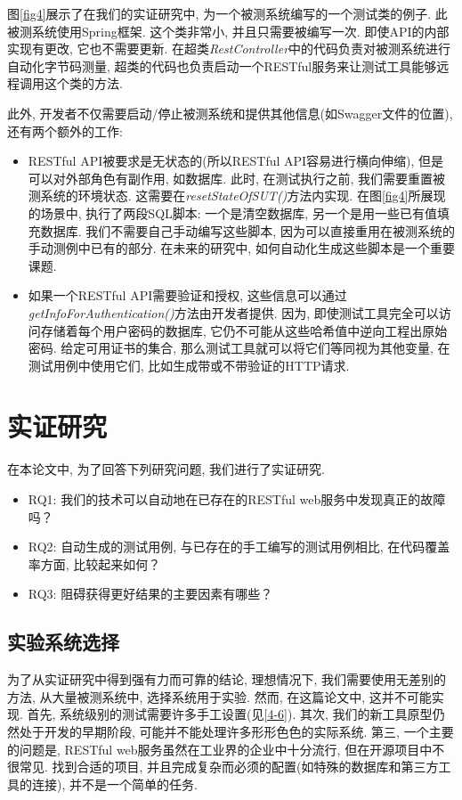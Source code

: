     图\ref{fig4}展示了在我们的实证研究中, 为一个被测系统编写的一个测试类的例子. 此被测系统使用Spring框架. 这个类非常小, 并且只需要被编写一次. 即使API的内部实现有更改, 它也不需要更新. 在超类\textit{RestController}中的代码负责对被测系统进行自动化字节码测量, 超类的代码也负责启动一个RESTful服务来让测试工具能够远程调用这个类的方法. 
    
    此外, 开发者不仅需要启动/停止被测系统和提供其他信息(如Swagger文件的位置), 还有两个额外的工作: 
    \begin{itemize}
      \item RESTful API被要求是无状态的(所以RESTful API容易进行横向伸缩), 但是可以对外部角色有副作用, 如数据库. 此时, 在测试执行之前, 我们需要重置被测系统的环境状态. 这需要在\textit{resetStateOfSUT()}方法内实现. 在图\ref{fig4}所展现的场景中, 执行了两段SQL脚本: 一个是清空数据库, 另一个是用一些已有值填充数据库. 我们不需要自己手动编写这些脚本, 因为可以直接重用在被测系统的手动测例中已有的部分. 在未来的研究中, 如何自动化生成这些脚本是一个重要课题. 
        
        \item 如果一个RESTful API需要验证和授权, 这些信息可以通过\textit{getInfoForAuthentication()}方法由开发者提供. 因为, 即使测试工具完全可以访问存储着每个用户密码的数据库, 它仍不可能从这些哈希值中逆向工程出原始密码. 给定可用证书的集合, 那么测试工具就可以将它们等同视为其他变量, 在测试用例中使用它们, 比如生成带或不带验证的HTTP请求. 
    \end{itemize}

\section{实证研究}
  在本论文中, 为了回答下列研究问题, 我们进行了实证研究. 
    \begin{itemize}
      \item RQ1: 我们的技术可以自动地在已存在的RESTful web服务中发现真正的故障吗？
      \item RQ2: 自动生成的测试用例, 与已存在的手工编写的测试用例相比, 在代码覆盖率方面, 比较起来如何？
        \item RQ3: 阻碍获得更好结果的主要因素有哪些？
    \end{itemize}
    
    \subsection{实验系统选择}
      为了从实证研究中得到强有力而可靠的结论, 理想情况下, 我们需要使用无差别的方法, 从大量被测系统中, 选择系统用于实验. 然而, 在这篇论文中, 这并不可能实现. 首先, 系统级别的测试需要许多手工设置(见\ref{4-6}). 其次, 我们的新工具原型仍然处于开发的早期阶段, 可能并不能处理许多形形色色的实际系统. 第三, 一个主要的问题是, RESTful web服务虽然在工业界的企业中十分流行, 但在开源项目中不很常见. 找到合适的项目, 并且完成复杂而必须的配置(如特殊的数据库和第三方工具的连接), 并不是一个简单的任务. 
        
